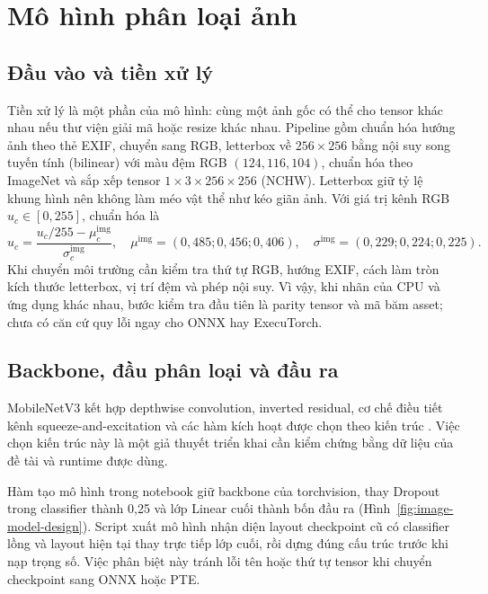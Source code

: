 \section{Mô hình phân loại ảnh}\label{sec:image-design}
\subsection{Đầu vào và tiền xử lý}
Tiền xử lý là một phần của mô hình: cùng một ảnh gốc có thể cho tensor khác nhau nếu thư viện giải mã hoặc resize khác nhau. Pipeline gồm chuẩn hóa hướng ảnh theo thẻ EXIF, chuyển sang RGB, letterbox về $256\times256$ bằng nội suy song tuyến tính (bilinear) với màu đệm RGB $(124,116,104)$, chuẩn hóa theo ImageNet và sắp xếp tensor $1\times3\times256\times256$ (NCHW). Letterbox giữ tỷ lệ khung hình nên không làm méo vật thể như kéo giãn ảnh. Với giá trị kênh RGB $u_c\in[0,255]$, chuẩn hóa là
\begin{equation}
\hat u_c=\frac{u_c/255-\mu_c^{\mathrm{img}}}{\sigma_c^{\mathrm{img}}},\quad
\mu^{\mathrm{img}}=(0{,}485;0{,}456;0{,}406),\quad
\sigma^{\mathrm{img}}=(0{,}229;0{,}224;0{,}225).
\end{equation}
Khi chuyển môi trường cần kiểm tra thứ tự RGB, hướng EXIF, cách làm tròn kích thước letterbox, vị trí đệm và phép nội suy. Vì vậy, khi nhãn của CPU và ứng dụng khác nhau, bước kiểm tra đầu tiên là parity tensor và mã băm asset; chưa có căn cứ quy lỗi ngay cho ONNX hay ExecuTorch.

\subsection{Backbone, đầu phân loại và đầu ra}
MobileNetV3 kết hợp depthwise convolution, inverted residual, cơ chế điều tiết kênh squeeze-and-excitation và các hàm kích hoạt được chọn theo kiến trúc \citep{howard2019mobilenetv3}. Việc chọn kiến trúc này là một giả thuyết triển khai cần kiểm chứng bằng dữ liệu của đề tài và runtime được dùng.

Hàm tạo mô hình trong notebook giữ backbone của torchvision, thay Dropout trong classifier thành 0,25 và lớp Linear cuối thành bốn đầu ra (Hình~\ref{fig:image-model-design}). Script xuất mô hình nhận diện layout checkpoint cũ có classifier lồng và layout hiện tại thay trực tiếp lớp cuối, rồi dựng đúng cấu trúc trước khi nạp trọng số. Việc phân biệt này tránh lỗi tên hoặc thứ tự tensor khi chuyển checkpoint sang ONNX hoặc PTE.

